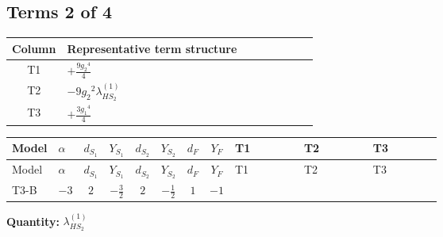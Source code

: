 \documentclass[8pt]{article}
\begin{document}
\begin{landscape}
\subsection*{Terms 2 of 4}
\begin{center}
\begin{tabular}{@{}c >{\raggedright\arraybackslash}p{0.82\linewidth}@{}}
\toprule
Column & Representative term structure \\
\midrule
T1 & \(\displaystyle +\frac{9 {g_2}^4}{4}\) \\
\midrule
T2 & \(\displaystyle -9 {g_2}^2 {\lambda_{HS_2}^{(1)}}\) \\
\midrule
T3 & \(\displaystyle +\frac{3 {g_1}^4}{4}\) \\
\midrule
\bottomrule
\end{tabular}
\end{center}
\smallskip
\tiny
\begin{longtable}{@{}llcccccc >{\raggedright\arraybackslash}p{0.21\linewidth} >{\raggedright\arraybackslash}p{0.21\linewidth} >{\raggedright\arraybackslash}p{0.21\linewidth}@{}}
\toprule
Model & $\alpha$ & $d_{S_1}$ & $Y_{S_1}$ & $d_{S_2}$ & $Y_{S_2}$ & $d_F$ & $Y_F$ & T1 & T2 & T3 \\
\midrule
\endfirsthead
\toprule
Model & $\alpha$ & $d_{S_1}$ & $Y_{S_1}$ & $d_{S_2}$ & $Y_{S_2}$ & $d_F$ & $Y_F$ & T1 & T2 & T3 \\
\midrule
\endhead
T3-B & $-3$ & $2$ & $-\frac{3}{2}$ & $2$ & $-\frac{1}{2}$ & $1$ & $-1$ & \scriptsize\adjustbox{max width=\linewidth}{$\begin{gathered} +\frac{9 {g_2}^4}{4}\end{gathered}$} & \scriptsize\adjustbox{max width=\linewidth}{$\begin{gathered} -9 {g_2}^2 {\lambda_{HS_2}^{(1)}}\end{gathered}$} & \scriptsize\adjustbox{max width=\linewidth}{$\begin{gathered} +\frac{3 {g_1}^4}{4}\end{gathered}$} \\
\midrule
\bottomrule
\end{longtable}
\clearpage
\noindent\textbf{Quantity: }$\lambda_{HS_2}^{(1)}$\par\smallskip

\end{landscape}
\end{document}
